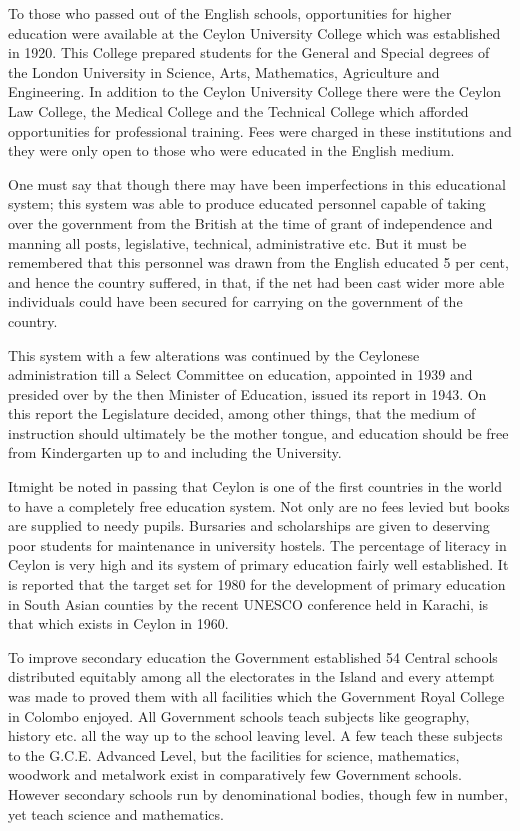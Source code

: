 To those who passed out of the English schools, opportunities for higher education were available at the Ceylon University College which was established in 1920. This College prepared students for the General and Special degrees of the London University in Science, Arts, Mathematics, Agriculture and Engineering. In addition to the Ceylon University College there were the Ceylon Law College, the Medical College and the Technical College which afforded opportunities for professional training. Fees were charged in these institutions and they were only open to those who were educated in the English medium.

One must say that though there may have been imperfections in this educational system; this system was able to produce educated personnel capable of taking over the government from the British at the time of grant of independence and manning all posts, legislative, technical, administrative etc. But it must be remembered that this personnel was drawn from the English educated 5 per cent, and hence the country suffered, in that, if the net had been cast wider more able individuals could have been secured for carrying on the government of the country.

This system with a few alterations was continued by the Ceylonese administration till a Select Committee on education, appointed in 1939 and presided over by the then Minister of Education, issued its report in 1943. On this report the Legislature decided, among other things, that the medium of instruction should ultimately be the mother tongue, and education should be free from Kindergarten up to and including the University.

It\pageoriginale might be noted in passing that Ceylon is one of the first countries in the world to have a completely free education system. Not only are no fees levied but books are supplied to needy pupils. Bursaries and scholarships are given to deserving poor students for maintenance in university hostels. The percentage of literacy in Ceylon is very high and its system of primary education fairly well established. It is reported that the target set for 1980 for the development of primary education in South Asian counties by the recent UNESCO conference held in Karachi, is that which exists in Ceylon in 1960.

To improve secondary education the Government established 54 Central schools distributed equitably among all the electorates in the Island and every attempt was made to proved them with all facilities which the Government Royal College in Colombo enjoyed. All Government schools teach subjects like geography, history etc. all the way up to the school leaving level. A few teach these subjects to the G.C.E. Advanced Level, but the facilities for science, mathematics, woodwork and metalwork exist in comparatively few Government schools. However secondary schools run by denominational bodies, though few in number, yet teach science and mathematics.


